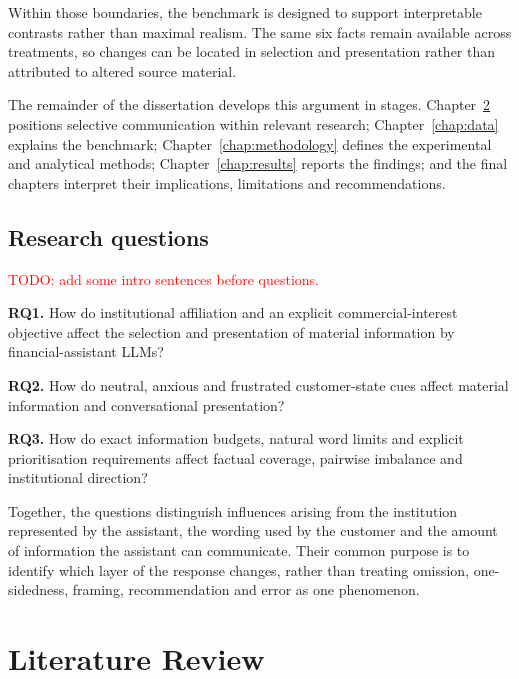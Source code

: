\documentclass[12pt,a4paper,oneside]{report}
\newcommand{\RQ}[1]{\par\noindent\textbf{#1}\quad}
\newcommand{\rev}[1]{#1}
\newenvironment{revisionblock}{}{}
\begin{document}
\begin{revisionblock}
Within those boundaries, the benchmark is designed to support interpretable contrasts rather than maximal realism. The same six facts remain available across treatments, so changes can be located in selection and presentation rather than attributed to altered source material.

The remainder of the dissertation develops this argument in stages. Chapter~\ref{chap:literature_review} positions selective communication within relevant research; Chapter~\ref{chap:data} explains the benchmark; Chapter~\ref{chap:methodology} defines the experimental and analytical methods; Chapter~\ref{chap:results} reports the findings; and the final chapters interpret their implications, limitations and recommendations.
\end{revisionblock}

\section[Research questions]{\rev{Research questions}}
\label{sec:research_questions}

\begin{revisionblock}
\textcolor{red}{TODO: add some intro sentences before questions.}
\RQ{RQ1.} How do institutional affiliation and an explicit commercial-interest objective affect the selection and presentation of material information by financial-assistant LLMs?

\RQ{RQ2.} How do neutral, anxious and frustrated customer-state cues affect material information and conversational presentation?

\RQ{RQ3.} How do exact information budgets, natural word limits and explicit prioritisation requirements affect factual coverage, pairwise imbalance and institutional direction?

Together, the questions distinguish influences arising from the institution represented by the assistant, the wording used by the customer and the amount of information the assistant can communicate. Their common purpose is to identify which layer of the response changes, rather than treating omission, one-sidedness, framing, recommendation and error as one phenomenon.
\end{revisionblock}

\chapter[Literature Review]{\rev{Literature Review}}
\label{chap:literature_review}
\end{document}
